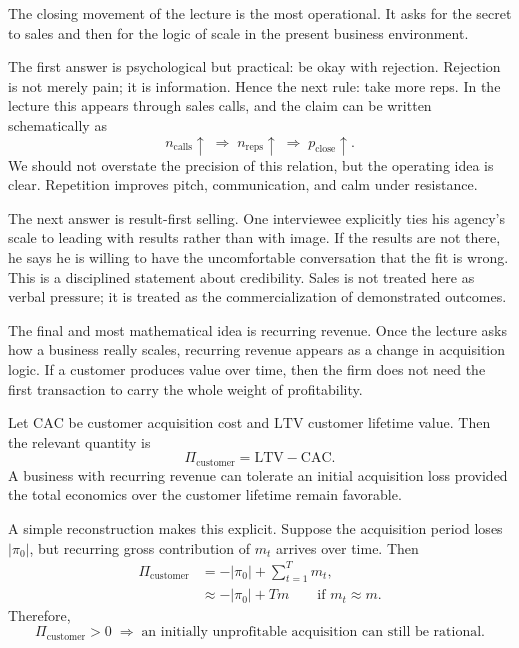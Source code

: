 The closing movement of the lecture is the most operational. It asks for the secret to sales and then for the logic of scale in the present business environment.

The first answer is psychological but practical: be okay with rejection. Rejection is not merely pain; it is information. Hence the next rule: take more reps. In the lecture this appears through sales calls, and the claim can be written schematically as
\begin{equation}
n_{\mathrm{calls}} \uparrow
\;\Longrightarrow\;
n_{\mathrm{reps}} \uparrow
\;\Longrightarrow\;
p_{\mathrm{close}} \uparrow.
\end{equation}
We should not overstate the precision of this relation, but the operating idea is clear. Repetition improves pitch, communication, and calm under resistance.

The next answer is result-first selling. One interviewee explicitly ties his agency's scale to leading with results rather than with image. If the results are not there, he says he is willing to have the uncomfortable conversation that the fit is wrong. This is a disciplined statement about credibility. Sales is not treated here as verbal pressure; it is treated as the commercialization of demonstrated outcomes.

The final and most mathematical idea is recurring revenue. Once the lecture asks how a business really scales, recurring revenue appears as a change in acquisition logic. If a customer produces value over time, then the firm does not need the first transaction to carry the whole weight of profitability.

Let \(\mathrm{CAC}\) be customer acquisition cost and \(\mathrm{LTV}\) customer lifetime value. Then the relevant quantity is
\begin{equation}
\Pi_{\mathrm{customer}}=\mathrm{LTV}-\mathrm{CAC}.
\end{equation}
A business with recurring revenue can tolerate an initial acquisition loss provided the total economics over the customer lifetime remain favorable.

A simple reconstruction makes this explicit. Suppose the acquisition period loses \(|\pi_0|\), but recurring gross contribution of \(m_t\) arrives over time. Then
\begin{align}
\Pi_{\mathrm{customer}}
&= -|\pi_0| + \sum_{t=1}^{T} m_t, \\
&\approx -|\pi_0| + Tm
\qquad
\text{if } m_t \approx m.
\end{align}
Therefore,
\begin{equation}
\Pi_{\mathrm{customer}} > 0
\;\Longrightarrow\;
\text{an initially unprofitable acquisition can still be rational.}
\end{equation}

